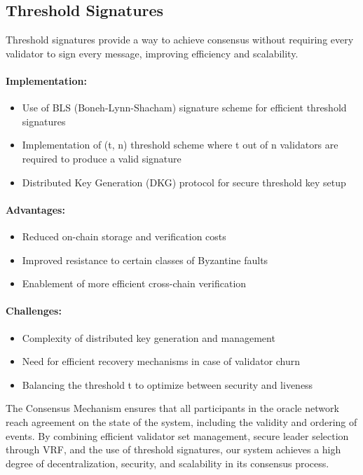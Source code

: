 \documentclass[12pt,a4paper]{article}
\begin{document}
	\subsection{Threshold Signatures}
	Threshold signatures provide a way to achieve consensus without requiring every validator to sign every message, improving efficiency and scalability.
	
	\paragraph{Implementation:}
	\begin{itemize}
		\item Use of BLS (Boneh-Lynn-Shacham) signature scheme for efficient threshold signatures
		\item Implementation of (t, n) threshold scheme where t out of n validators are required to produce a valid signature
		\item Distributed Key Generation (DKG) protocol for secure threshold key setup
	\end{itemize}
	
	\paragraph{Advantages:}
	\begin{itemize}
		\item Reduced on-chain storage and verification costs
		\item Improved resistance to certain classes of Byzantine faults
		\item Enablement of more efficient cross-chain verification
	\end{itemize}
	
	\paragraph{Challenges:}
	\begin{itemize}
		\item Complexity of distributed key generation and management
		\item Need for efficient recovery mechanisms in case of validator churn
		\item Balancing the threshold t to optimize between security and liveness
	\end{itemize}
	
	The Consensus Mechanism ensures that all participants in the oracle network reach agreement on the state of the system, including the validity and ordering of events. By combining efficient validator set management, secure leader selection through VRF, and the use of threshold signatures, our system achieves a high degree of decentralization, security, and scalability in its consensus process.
	
\end{document}
